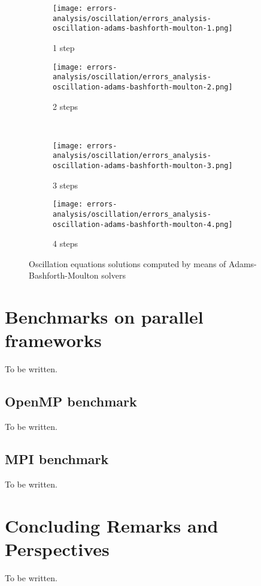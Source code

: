 \documentclass[pdftex,preprint,3p,times,numbers]{elsarticle}
\begin{document}
\begin{figure}[!ht]
  \centering
  \begin{subfigure}[b]{0.45\textwidth}
    \centering
    \texttt{[image: errors-analysis/oscillation/errors\_analysis-oscillation-adams-bashforth-moulton-1.png]}
    \caption{1 step}\label{fig:results-oscillation-adams-bashforth-moulton-1}
  \end{subfigure}\quad%
  \begin{subfigure}[b]{0.45\textwidth}
    \centering
    \texttt{[image: errors-analysis/oscillation/errors\_analysis-oscillation-adams-bashforth-moulton-2.png]}
    \caption{2 steps}\label{fig:results-oscillation-adams-bashforth-moulton-2}
  \end{subfigure}\\
  \begin{subfigure}[b]{0.45\textwidth}
    \centering
    \texttt{[image: errors-analysis/oscillation/errors\_analysis-oscillation-adams-bashforth-moulton-3.png]}
    \caption{3 steps}\label{fig:results-oscillation-adams-bashforth-moulton-3}
  \end{subfigure}\quad%
  \begin{subfigure}[b]{0.45\textwidth}
    \centering
    \texttt{[image: errors-analysis/oscillation/errors\_analysis-oscillation-adams-bashforth-moulton-4.png]}
    \caption{4 steps}\label{fig:results-oscillation-adams-bashforth-moulton-4}
  \end{subfigure}
  \caption{Oscillation equations solutions computed by means of Adams-Bashforth-Moulton solvers}\label{fig:results-oscillation-adams-bashforth-moulton}
\end{figure}
\clearpage

\section{Benchmarks on parallel frameworks}\label{sec:parallel}

{\color{red} To be written.}

\subsection{OpenMP benchmark}\label{subsec:openmp}

{\color{red} To be written.}

\subsection{MPI benchmark}\label{subsec:mpi}

{\color{red} To be written.}

\section{Concluding Remarks and Perspectives}\label{sec:conclusions}

{\color{red} To be written.}



\end{document}
